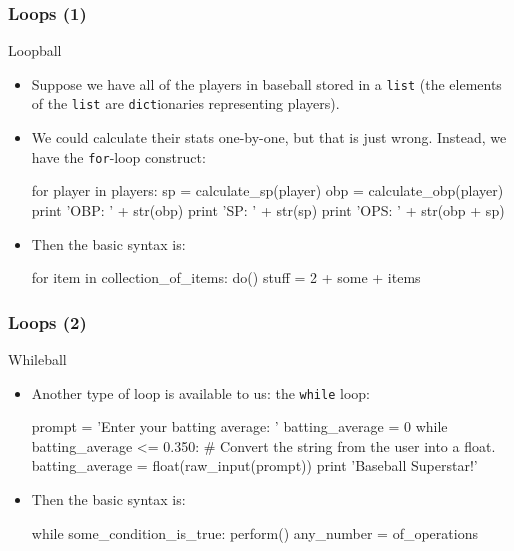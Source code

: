 \documentclass[10pt]{beamer}
\begin{document}
\begin{frame}[fragile]
  \frametitle{Loops (1)}
  \begin{block}{Loopball}
    \begin{itemize}
      \item Suppose we have all of the players in baseball stored in a \texttt{list} (the elements of the \texttt{list} are \texttt{dict}ionaries representing players).
      \item We could calculate their stats one-by-one, but that is just wrong.
        Instead, we have the \texttt{for}-loop construct:
        \begin{pythoncode}
  for player in players:
    sp = calculate_sp(player)
    obp = calculate_obp(player)
    print 'OBP: ' + str(obp)
    print 'SP: ' + str(sp)
    print 'OPS: ' + str(obp + sp)
        \end{pythoncode}
      \item Then the basic syntax is:
      \begin{pythoncode}
  for item in collection_of_items:
    do()
    stuff = 2 + some + items
      \end{pythoncode}
    \end{itemize}
  \end{block}
\end{frame}

\begin{frame}[fragile]
  \frametitle{Loops (2)}
  \begin{block}{Whileball}
    \begin{itemize}
      \item Another type of loop is available to us: the \texttt{while} loop:
        \begin{pythoncode}
  prompt = 'Enter your batting average: '
  batting_average = 0
  while batting_average <= 0.350:
    # Convert the string from the user into a float.
    batting_average = float(raw_input(prompt))
  print 'Baseball Superstar!'
        \end{pythoncode}
      \item Then the basic syntax is:
        \begin{pythoncode}
  while some_condition_is_true:
    perform()
    any_number = of_operations
        \end{pythoncode}
    \end{itemize}
  \end{block}
\end{frame}
\end{document}
